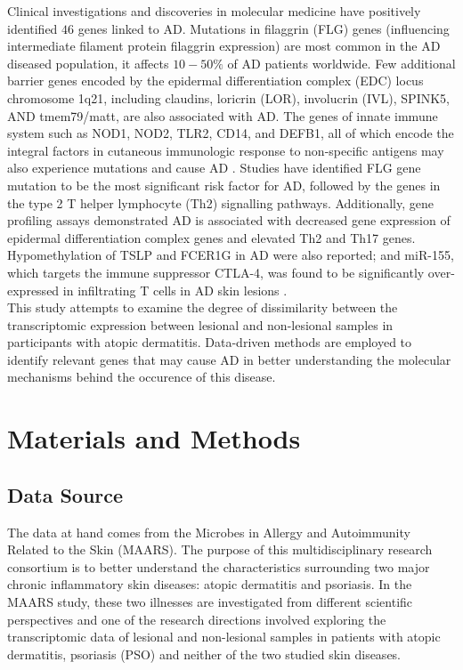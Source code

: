 \documentclass[journal, a4paper]{IEEEtran}
\begin{document}
Clinical investigations and discoveries in molecular medicine have positively identified $46$ genes linked to AD. Mutations in filaggrin (FLG) genes (influencing intermediate filament protein filaggrin expression) are most common in the AD diseased population, it affects $10-50\%$ of AD patients worldwide. Few additional barrier genes encoded by the epidermal differentiation complex (EDC) locus chromosome 1q21, including claudins, loricrin (LOR), involucrin (IVL), SPINK5, AND tmem79/matt, are also associated with AD. The genes of innate immune system such as NOD1, NOD2, TLR2, CD14, and DEFB1, all of which encode the integral factors in cutaneous immunologic response to non-specific antigens may also experience mutations and cause AD \cite{guttman2017atopic}. Studies have identified FLG gene mutation to be the most significant risk factor for AD, followed by the genes in the type 2 T helper lymphocyte (Th2) signalling pathways. Additionally, gene profiling assays demonstrated AD is associated with decreased gene expression of epidermal differentiation complex genes and elevated Th2 and Th17 genes. Hypomethylation of TSLP and FCER1G in AD were also reported; and miR-155, which targets the immune suppressor CTLA-4, was found to be significantly over-expressed in infiltrating T cells in AD skin lesions \cite{guttman2017atopic, bin2016genetic}.\\

This study attempts to examine the degree of dissimilarity between the transcriptomic expression between lesional and non-lesional samples in participants with atopic dermatitis. Data-driven methods are employed to identify relevant genes that may cause AD in better understanding the molecular mechanisms behind the occurence of this disease.

\section{Materials and Methods}

\subsection{Data Source}

The data at hand comes from the Microbes in Allergy and Autoimmunity Related to the Skin (MAARS). The purpose of this multidisciplinary research consortium is to better understand the characteristics surrounding two major chronic inflammatory skin diseases: atopic dermatitis and psoriasis\cite{MAARS}. In the MAARS study, these two illnesses are investigated from different scientific perspectives and one of the research directions involved exploring the transcriptomic data of lesional and non-lesional samples in patients with atopic dermatitis, psoriasis (PSO) and neither of the two studied skin diseases. 
\end{document}

